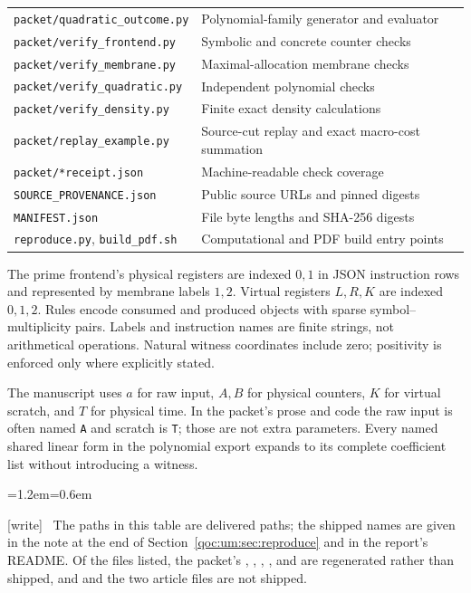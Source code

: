 \documentclass[11pt,letterpaper]{article}
\theoremstyle{definition}
\theoremstyle{remark}
\newcommand{\file}[1]{\nolinkurl{#1}}
\newcommand{\wtag}{\textup{[write]}}
\newenvironment{writenote}{\par\smallskip\begin{list}{}{\leftmargin=1.2em\rightmargin=0.6em}\item[]\small\wtag\ }{\end{list}\smallskip}
\begin{document}
\begin{longtable}{@{}>{\raggedright\arraybackslash}p{}>{\raggedright\arraybackslash}p{}@{}}
\file{packet/quadratic_outcome.py} & Polynomial-family generator and evaluator\\
\file{packet/verify_frontend.py} & Symbolic and concrete counter checks\\
\file{packet/verify_membrane.py} & Maximal-allocation membrane checks\\
\file{packet/verify_quadratic.py} & Independent polynomial checks\\
\file{packet/verify_density.py} & Finite exact density calculations\\
\file{packet/replay_example.py} & Source-cut replay and exact macro-cost summation\\
\file{packet/*receipt.json} & Machine-readable check coverage\\
\file{SOURCE_PROVENANCE.json} & Public source URLs and pinned digests\\
\file{MANIFEST.json} & File byte lengths and SHA-256 digests\\
\file{reproduce.py}, \file{build_pdf.sh} & Computational and PDF build entry points\\
\bottomrule
\end{longtable}
The prime frontend's physical registers are indexed $0,1$ in JSON instruction rows and represented by membrane labels $1,2$. Virtual registers $L,R,K$ are indexed $0,1,2$. Rules encode consumed and produced objects with sparse symbol--multiplicity pairs. Labels and instruction names are finite strings, not arithmetical operations. Natural witness coordinates include zero; positivity is enforced only where explicitly stated.

The manuscript uses $a$ for raw input, $A,B$ for physical counters, $K$ for virtual scratch, and $T$ for physical time. In the packet's prose and code the raw input is often named \file{A} and scratch is \file{T}; those are not extra parameters. Every named shared linear form in the polynomial export expands to its complete coefficient list without introducing a witness.

\begin{writenote}
The paths in this table are delivered paths; the shipped names are given in the note at the end of Section~\ref{qoc:um:sec:reproduce} and in the report's README. Of the files listed, the packet's , , , ,  and  are regenerated rather than shipped, and  and the two article files are not shipped.
\end{writenote}
\end{document}

